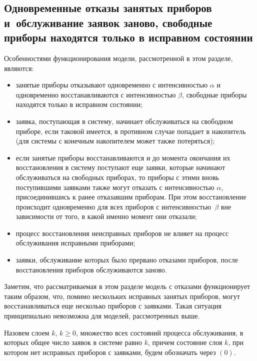 \begin{multicols}{2}
\section{Одновременные отказы занятых приборов и~обслуживание заявок
заново, свободные приборы находятся только в исправном состоянии}         %

Особенностями функционирования модели, рассмотренной в этом
разделе, являются:
\begin{itemize}
\item занятые приборы отказывают одновременно с интенсивностью $\alpha$
и одновременно восстанавливаются с интенсивностью $\beta$,
свободные приборы находятся только в исправном состоянии;%
\item
заявка, поступающая в систему, начинает обслуживаться на
свободном приборе, если таковой имеется, в противном случае
попадает в накопитель (для системы с конечным накопителем
может также потеряться);%
\item
если занятые приборы восстанавливаются и до момента окончания их
восстановления в систему поступают еще заявки, которые начинают
обслуживаться на свободных приборах, то приборы с этими
вновь поступившими заявками также могут отказать с интенсивностью
$\alpha$, присоединившись к ранее отказавшим приборам.
При этом восстановление происходит одновременно для всех приборов
с интенсивностью~$\beta$ вне зависимости от того, в какой именно
момент они отказали;%
\item
процесс восстановления неисправных приборов не влияет на
процесс обслуживания исправными приборами;%
\item
заявки, обслуживание которых было прервано отказами приборов,
после восстановления приборов обслуживаются заново.
\end{itemize}

Заметим, что рассматриваемая в этом разделе модель с отказами
функционирует таким образом, что, помимо нескольких исправных
занятых приборов, могут восстанавливаться еще несколько приборов
с заявками. Такая ситуация принципиально невозможна для моделей,
рассмотренных выше.

Назовем слоем $k$, $k\ge 0$, множество всех состояний процесса
обслуживания, в которых общее число заявок в системе равно $k$,
причем состояние слоя $k$, при котором нет исправных приборов с
заявками, будем обозначать через $(0)$.


\end{multicols}
